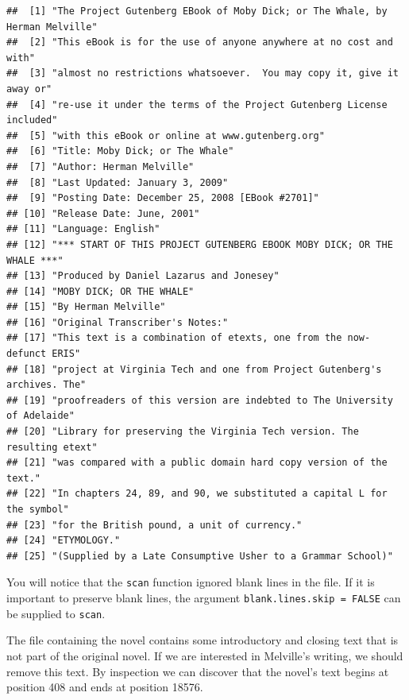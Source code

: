 \documentclass[
]{krantz}
\begin{document}
\begin{verbatim}
##  [1] "The Project Gutenberg EBook of Moby Dick; or The Whale, by Herman Melville"
##  [2] "This eBook is for the use of anyone anywhere at no cost and with"          
##  [3] "almost no restrictions whatsoever.  You may copy it, give it away or"      
##  [4] "re-use it under the terms of the Project Gutenberg License included"       
##  [5] "with this eBook or online at www.gutenberg.org"                            
##  [6] "Title: Moby Dick; or The Whale"                                            
##  [7] "Author: Herman Melville"                                                   
##  [8] "Last Updated: January 3, 2009"                                             
##  [9] "Posting Date: December 25, 2008 [EBook #2701]"                             
## [10] "Release Date: June, 2001"                                                  
## [11] "Language: English"                                                         
## [12] "*** START OF THIS PROJECT GUTENBERG EBOOK MOBY DICK; OR THE WHALE ***"     
## [13] "Produced by Daniel Lazarus and Jonesey"                                    
## [14] "MOBY DICK; OR THE WHALE"                                                   
## [15] "By Herman Melville"                                                        
## [16] "Original Transcriber's Notes:"                                             
## [17] "This text is a combination of etexts, one from the now-defunct ERIS"       
## [18] "project at Virginia Tech and one from Project Gutenberg's archives. The"   
## [19] "proofreaders of this version are indebted to The University of Adelaide"   
## [20] "Library for preserving the Virginia Tech version. The resulting etext"     
## [21] "was compared with a public domain hard copy version of the text."          
## [22] "In chapters 24, 89, and 90, we substituted a capital L for the symbol"     
## [23] "for the British pound, a unit of currency."                                
## [24] "ETYMOLOGY."                                                                
## [25] "(Supplied by a Late Consumptive Usher to a Grammar School)"
\end{verbatim}

You will notice that the \texttt{scan} function ignored blank lines in the file. If it is important to preserve blank lines, the argument \texttt{blank.lines.skip\ =\ FALSE} can be supplied to \texttt{scan}.

The file containing the novel contains some introductory and closing text that is not part of the original novel. If we are interested in Melville's writing, we should remove this text. By inspection we can discover that the novel's text begins at position 408 and ends at position 18576.
\end{document}
